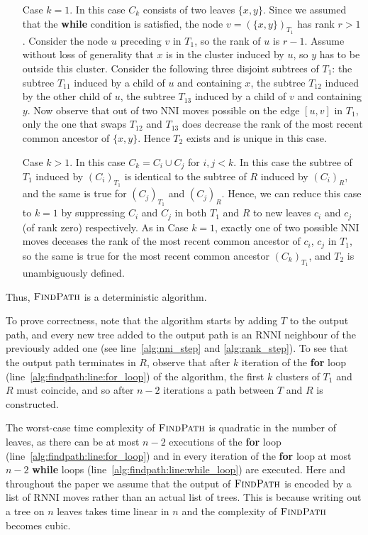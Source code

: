 \documentclass[11pt]{amsart}
\newcommand{\rnni}{\mathrm{RNNI}}
\newcommand{\findpath}{\textsc{FindPath}}
\newcommand{\nni}{\mathrm{NNI}}
\begin{document}
\begin{itemize}
\item[Case $k = 1$.]
In this case $C_k$ consists of two leaves $\{x, y\}$.
Since we assumed that the \textbf{while} condition is satisfied, the node $v = (\{x, y\})_{T_1}$ has rank $r > 1$.
Consider the node $u$ preceding $v$ in $T_1$, so the rank of $u$ is $r - 1$.
Assume without loss of generality that $x$ is in the cluster induced by $u$, so $y$ has to be outside this cluster.
Consider the following three disjoint subtrees of $T_1$: the subtree $T_{11}$ induced by a child of $u$ and containing $x$, the subtree $T_{12}$ induced by the other child of $u$, the subtree $T_{13}$ induced by a child of $v$ and containing $y$.
Now observe that out of two $\nni$ moves possible on the edge $[u, v]$ in $T_1$, only the one that swaps $T_{12}$ and $T_{13}$ does decrease the rank of the most recent common ancestor of $\{x, y\}$.
Hence $T_2$ exists and is unique in this case.

\item[Case $k > 1$.]
In this case $C_k = C_i \cup C_j$ for $i, j < k$.
In this case the subtree of $T_1$ induced by $(C_i)_{T_1}$ is identical to the subtree of $R$ induced by $(C_i)_R$, and the same is true for $(C_j)_{T_1}$ and $(C_j)_R$.
Hence, we can reduce this case to $k = 1$ by suppressing $C_i$ and $C_j$ in both $T_1$ and $R$ to new leaves $c_i$ and $c_j$ (of rank zero) respectively.
As in Case $k = 1$, exactly one of two possible $\nni$ moves deceases the rank of the most recent common ancestor of $c_i$, $c_j$ in $T_1$, so the same is true for the most recent common ancestor $(C_k)_{T_1}$, and $T_2$ is unambiguously defined.
\end{itemize}

Thus, $\findpath$ is a deterministic algorithm.

To prove correctness, note that the algorithm starts by adding $T$ to the output path, and every new tree added to the output path is an $\rnni$ neighbour of the previously added one (see line~\ref{alg:nni_step} and \ref{alg:rank_step}).
To see that the output path terminates in $R$, observe that after $k$ iteration of the \textbf{for} loop (line~\ref{alg:findpath:line:for_loop}) of the algorithm, the first $k$ clusters of $T_1$ and $R$ must coincide, and so after $n-2$ iterations a path between $T$ and $R$ is constructed.

The worst-case time complexity of $\findpath$ is quadratic in the number of leaves, as there can be at most $n-2$ executions of the \textbf{for} loop (line~\ref{alg:findpath:line:for_loop}) and in every iteration of the \textbf{for} loop at most $n-2$ \textbf{while} loops (line~\ref{alg:findpath:line:while_loop}) are executed.
Here and throughout the paper we assume that the output of $\findpath$ is encoded by a list of $\rnni$ moves rather than an actual list of trees.
This is because writing out a tree on $n$ leaves takes time linear in $n$ and the complexity of $\findpath$ becomes cubic.
\endproof
\end{document}
